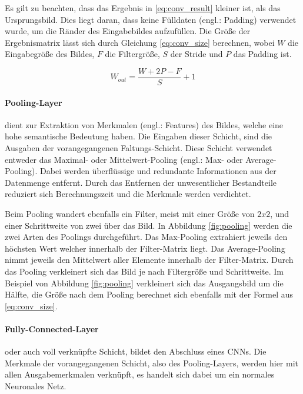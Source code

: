 Es gilt zu beachten, dass das Ergebnis in \ref{eq:conv_result} kleiner ist, als das Ursprungsbild. Dies liegt daran, dass keine Fülldaten (engl.: Padding) verwendet wurde, um die Ränder des Eingabebildes aufzufüllen. Die Größe der Ergebnismatrix lässt sich durch Gleichung \ref{eq:conv_size} berechnen, wobei $W$ die Eingabegröße des Bildes, $F$ die Filtergröße, $S$ der Stride und $P$ das Padding ist. \cite[vgl.][]{Teoh2023}

\begin{equation}
	W_{out}= \dfrac{W+2P-F}{S}+1
	\label{eq:conv_size}
\end{equation}

\paragraph{Pooling-Layer} dient zur Extraktion von Merkmalen (engl.: Features) des Bildes, welche eine hohe semantische Bedeutung haben. Die Eingaben dieser Schicht, sind die Ausgaben der vorangegangenen Faltungs-Schicht. Diese Schicht verwendet entweder das Maximal- oder Mittelwert-Pooling (engl.: Max- oder Average-Pooling). Dabei werden überflüssige und redundante Informationen aus der Datenmenge entfernt. Durch das Entfernen der unwesentlicher Bestandteile reduziert sich Berechnungszeit und die Merkmale werden verdichtet. 

Beim Pooling wandert ebenfalls ein Filter, meist mit einer Größe von $2x2$, und einer Schrittweite von zwei über das Bild. In Abbildung \ref{fig:pooling} werden die zwei Arten des Poolings durchgeführt. Das Max-Pooling extrahiert jeweils den höchsten Wert welcher innerhalb der Filter-Matrix liegt. Das Average-Pooling nimmt jeweils den Mittelwert aller Elemente innerhalb der Filter-Matrix. Durch das Pooling verkleinert sich das Bild je nach Filtergröße und Schrittweite.\cite[vgl.][]{Teoh2023} Im Beispiel von Abbildung \ref{fig:pooling} verkleinert sich das Ausgangsbild um die Hälfte, die Größe nach dem Pooling berechnet sich ebenfalls mit der Formel aus \ref{eq:conv_size}.

\paragraph{Fully-Connected-Layer} oder auch voll verknüpfte Schicht, bildet den Abschluss eines \ac{CNN}s. Die Merkmale der vorangegangenen Schicht, also des Pooling-Layers, werden hier mit allen Ausgabemerkmalen verknüpft, es handelt sich dabei um ein normales Neuronales Netz. 

